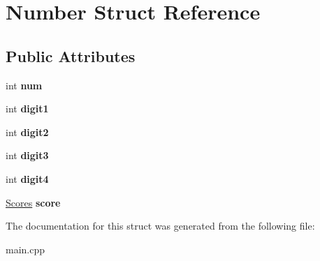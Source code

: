 \hypertarget{struct_number}{}\section{Number Struct Reference}
\label{struct_number}
\subsection*{Public Attributes}
\begin{DoxyCompactItemize}
\item 
\mbox{\label{struct_number_a9aac5a226a2a5825416df359b64787a6}} 
int {\bfseries num}
\item 
\mbox{\label{struct_number_a68db199187f7442bcebd6d59a5b95a1c}} 
int {\bfseries digit1}
\item 
\mbox{\label{struct_number_aa64581b2c644b211cc68f15b73a9b639}} 
int {\bfseries digit2}
\item 
\mbox{\label{struct_number_a3d137724f3d24698cefee313097a2ad7}} 
int {\bfseries digit3}
\item 
\mbox{\label{struct_number_a079bbfe66f5ba48099a7e07e9cb277f1}} 
int {\bfseries digit4}
\item 
\mbox{\label{struct_number_a0f27a53d6a6e565811886fd404717258}} 
\hyperlink{struct_scores}{Scores} {\bfseries score}
\end{DoxyCompactItemize}


The documentation for this struct was generated from the following file\+:\begin{DoxyCompactItemize}
\item 
main.\+cpp\end{DoxyCompactItemize}
